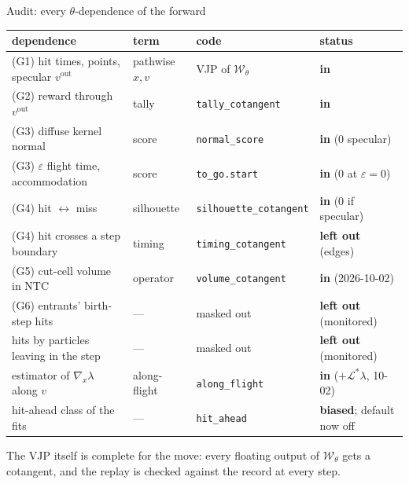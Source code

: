 \documentclass[10pt,aspectratio=169]{beamer}
\newcommand{\code}[1]{\texttt{\small #1}}
\newcommand{\ok}{\textcolor{green!50!black}{\textbf{in}}}
\newcommand{\out}{\textcolor{orange!80!black}{\textbf{left out}}}
\begin{document}
\begin{frame}{Audit: every $\theta$-dependence of the forward}
\footnotesize
\begin{tabular}{@{}llll@{}}
\toprule
dependence & term & code & status\\
\midrule
(G1) hit times, points, specular $v^{\mathrm{out}}$ & pathwise $x, v$ & VJP of $\mathcal W_\theta$ & \ok\\
(G2) reward through $v^{\mathrm{out}}$ & tally & \code{tally\_cotangent} & \ok\\
(G3) diffuse kernel normal & score & \code{normal\_score} & \ok{} (0 specular)\\
(G3) $\varepsilon$ flight time, accommodation & score & \code{to\_go.start} & \ok{} (0 at $\varepsilon{=}0$)\\
(G4) hit $\leftrightarrow$ miss & silhouette & \code{silhouette\_cotangent} & \ok{} (0 if specular)\\
(G4) hit crosses a step boundary & timing & \code{timing\_cotangent} & \out{} (edges)\\
(G5) cut-cell volume in NTC & operator & \code{volume\_cotangent} & \ok{} (2026-10-02)\\
(G6) entrants' birth-step hits & --- & masked out & \out{} (monitored)\\
hits by particles leaving in the step & --- & masked out & \out{} (monitored)\\
\midrule
estimator of $\nabla_x\lambda$ along $v$ & along-flight & \code{along\_flight} & \ok{} ($+\mathcal L^*\lambda$, 10-02)\\
hit-ahead class of the fits & --- & \code{hit\_ahead} & \textbf{biased}; default now off\\
\bottomrule
\end{tabular}

\medskip
The VJP itself is complete for the move: every floating output of $\mathcal W_\theta$ gets a
cotangent, and the replay is checked against the record at every step.
\end{frame}
\end{document}

